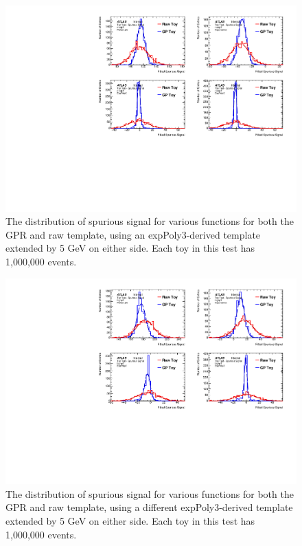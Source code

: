 \begin{figure} 
\begin{center}
  \includegraphics[width=\textwidth]{figures/background/gpr/validation/padded/ToyTest_FitSigVals_medpT_1M_noSig}   
\caption{The distribution of spurious signal for various functions for both the GPR and raw template, using an expPoly3-derived template extended by 5 GeV on either side. Each toy in this test has 1,000,000 events.}
\label{fig:padded_medpt_1M_noSig}
\end{center}
\end{figure}

\begin{figure} 
\begin{center}
  \includegraphics[width=\textwidth]{figures/background/gpr/validation/padded/ToyTest_FitSigVals_highpT_1M_noSig}   
\caption{The distribution of spurious signal for various functions for both the GPR and raw template, using a different expPoly3-derived template extended by 5 GeV on either side. Each toy in this test has 1,000,000 events.}
\label{fig:padded_highpt_1M_noSig}
\end{center}
\end{figure}


